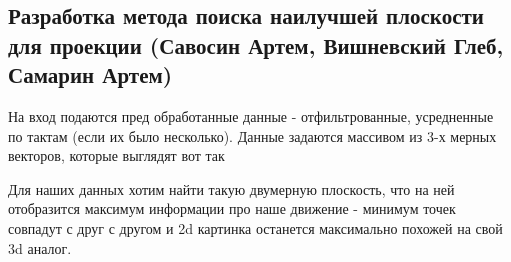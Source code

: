\subsection{Разработка метода поиска наилучшей плоскости для проекции (Савосин Артем, Вишневский Глеб, Самарин Артем)}

На вход подаются пред обработанные данные - отфильтрованные, усредненные по тактам (если их было несколько). Данные задаются массивом из 3-х мерных векторов, которые выглядят вот так
\begin{figure}[H]
\end{figure}
Для наших данных хотим найти такую двумерную плоскость, что на ней отобразится максимум информации про наше движение - минимум точек совпадут с друг с другом и 2d картинка останется максимально похожей на свой 3d аналог. 


